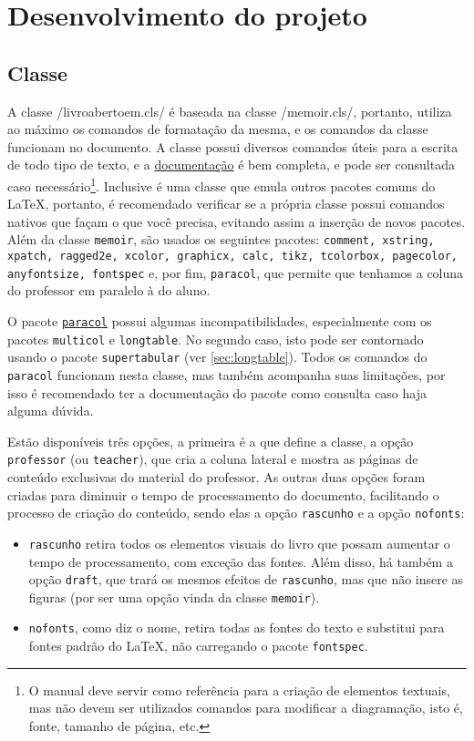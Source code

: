 \section{Desenvolvimento do projeto}\label{sec:desenvolvimento-projeto}

\subsection{Classe}

A classe \latexinline/livroabertoem.cls/ é baseada na classe
\latexinline/memoir.cls/, portanto, utiliza ao máximo os comandos de
formatação da mesma, e os comandos da classe funcionam no documento. A
classe possui diversos comandos úteis para a escrita de todo tipo de
texto, e a
\href{https://linorg.usp.br/CTAN/macros/latex/contrib/memoir/memman.pdf}{documentação}
é bem completa, e pode ser consultada caso necessário\footnote{O manual
	deve servir como referência para a criação de elementos textuais, mas
	não devem ser utilizados comandos para modificar a diagramação, isto é,
	fonte, tamanho de página, etc. }. Inclusive é uma classe que emula
outros pacotes comuns do \LaTeX, portanto, é recomendado verificar se a
própria classe possui comandos nativos que façam o que você precisa,
evitando assim a inserção de novos pacotes. Além da classe
\verb|memoir|, são usados os seguintes pacotes: \texttt{comment,
	xstring, xpatch, ragged2e, xcolor, graphicx, calc, tikz, tcolorbox,
	pagecolor, anyfontsize, fontspec} e, por fim, \verb|paracol|, que
permite que tenhamos a coluna do professor em paralelo à do aluno.%

O pacote
\href{https://linorg.usp.br/CTAN/macros/latex/contrib/paracol/paracol-man.pdf}{\texttt{paracol}}
possui algumas incompatibilidades, especialmente com os pacotes
\verb|multicol| e \verb|longtable|. No segundo caso, isto pode ser
contornado usando o pacote \verb|supertabular| (ver
\cref{sec:longtable}). Todos os comandos do \verb|paracol| funcionam
nesta classe, mas também acompanha suas limitações, por isso é
recomendado ter a documentação do pacote como consulta caso haja alguma
dúvida.%

Estão disponíveis três opções, a primeira é a que define a classe, a
opção \verb|professor| (ou \verb|teacher|), que cria a coluna lateral e
mostra as páginas de conteúdo exclusivas do material do professor. As
outras duas opções foram criadas para diminuir o tempo de processamento
do documento, facilitando o processo de criação do conteúdo, sendo elas
a opção \verb|rascunho| e a opção \verb|nofonts|:
\begin{itemize}
	\item \verb|rascunho| retira todos os elementos visuais do livro que possam aumentar o tempo
	      de processamento, com exceção das fontes. Além disso, há também a opção \verb|draft|, que trará
	      os mesmos efeitos de \verb|rascunho|, mas que não insere as figuras (por ser uma opção
	      vinda da classe \verb|memoir|).
	\item \verb|nofonts|, como diz o nome, retira todas as fontes do texto e substitui para
	      fontes padrão do \LaTeX, não carregando o pacote \verb|fontspec|.
\end{itemize}

